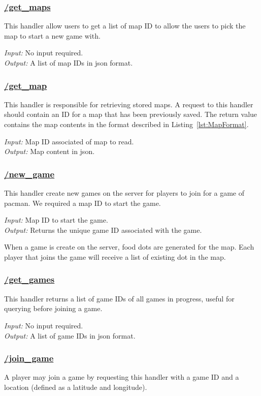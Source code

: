 \documentclass{acm_proc_article-sp}
\begin{document}
\subsubsection{\url{/get_maps}}
This handler allow users to get a list of map ID to allow the users to
pick the map to start a new game with.

\emph{Input:} No input required.\\
\emph{Output:} A list of map IDs in json format.

\subsubsection{\url{/get_map}}
This handler is responsible for retrieving stored maps. A request to this
handler should contain an ID for a map that has been previously saved. The
return value contains the map contents in the format described in
Listing~\ref{lst:MapFormat}.

\emph{Input:} Map ID associated of map to read. \\
\emph{Output:} Map content in json.


\subsubsection{\url{/new_game}}\label{newgame}
This handler create new games on the server for players to join for a
game of pacman. We required a map ID to start the game.

\emph{Input:} Map ID to start the game.\\
\emph{Output:} Returns the unique game ID associated with the game.

When a game is create on the server, food dots are generated for the
map. Each player that joins the game will receive a list of existing
dot in the map.

\subsubsection{\url{/get_games}}
This handler returns a list of game IDs of all games in progress, useful
for querying before joining a game.

\emph{Input:} No input required.\\
\emph{Output:} A list of game IDs in json format.

\subsubsection{\url{/join_game}}
A player may join a game by requesting this handler with a game ID and
a location (defined as a latitude and longitude).
\end{document}
